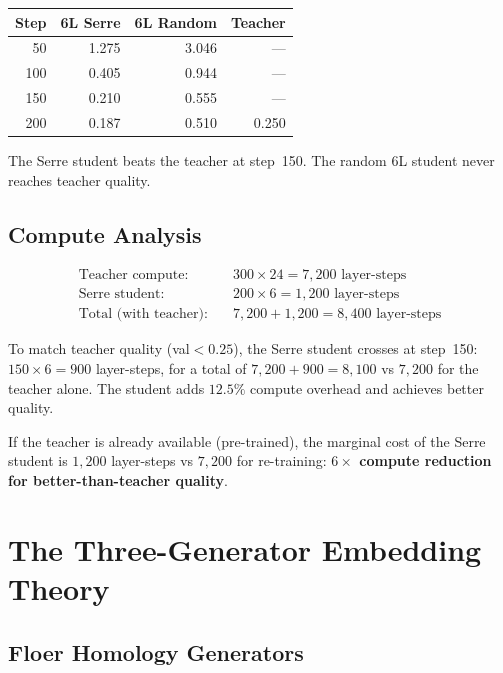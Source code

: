 \documentclass[11pt,a4paper]{article}
\begin{document}
\begin{center}
\begin{tabular}{rrrr}
\toprule
Step & 6L Serre & 6L Random & Teacher \\
\midrule
50 & 1.275 & 3.046 & --- \\
100 & 0.405 & 0.944 & --- \\
150 & 0.210 & 0.555 & --- \\
200 & 0.187 & 0.510 & 0.250 \\
\bottomrule
\end{tabular}
\end{center}

The Serre student beats the teacher at step~150. The random 6L student
never reaches teacher quality.

\subsection{Compute Analysis}

\begin{align*}
\text{Teacher compute:} &\quad 300 \times 24 = 7{,}200 \text{ layer-steps} \\
\text{Serre student:}   &\quad 200 \times 6 = 1{,}200 \text{ layer-steps} \\
\text{Total (with teacher):} &\quad 7{,}200 + 1{,}200 = 8{,}400 \text{ layer-steps}
\end{align*}

To match teacher quality (val${<}0.25$), the Serre student crosses at
step~150: $150 \times 6 = 900$ layer-steps, for a total of
$7{,}200 + 900 = 8{,}100$ vs $7{,}200$ for the teacher alone.
The student adds $12.5\%$ compute overhead and achieves better quality.

If the teacher is already available (pre-trained), the marginal cost of
the Serre student is $1{,}200$ layer-steps vs $7{,}200$ for re-training:
\textbf{$6{\times}$ compute reduction for better-than-teacher quality}.

\section{The Three-Generator Embedding Theory}
\label{sec:generators}

\subsection{Floer Homology Generators}
\end{document}
